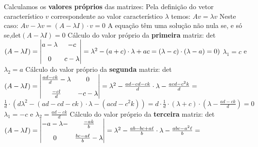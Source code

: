 \bigskip\medskip\noindent Calculamos os \textbf{valores próprios} das matrizes:\bigskip\newline\noindent
Pela definição do vetor característico $v$ correspondente ao valor característico $\lambda$ temos:\newline
$Av=\lambda v$\newline
Neste caso:\newline
$Av-\lambda v=(A- \lambda I) \cdot v=0$\newline
A equação têm uma solução não nula se, e só se,\newline det$(A- \lambda I)=0$
\newpage
\noindent Cálculo do valor próprio da \textbf{primeira} matriz:\bigskip\medskip\newline\noindent
det$(A- \lambda I)=\renewcommand{\arraystretch}{1.25}
\begin{vmatrix}
  a-\lambda & -c\medskip  \\
  0 & c- \lambda
\end{vmatrix}=\lambda^2-(a+c)\cdot \lambda +ac=(\lambda-c) \cdot (\lambda -a)=0)$\medskip\newline
$\lambda_1=c$ e $\lambda_2=a$
\bigskip\newline\noindent Cálculo do valor próprio da \textbf{segunda} matriz: \bigskip\medskip\newline\noindent
det$(A- \lambda I)=\renewcommand{\arraystretch}{1.25}
\begin{vmatrix}
  \frac{ad-ck}{d}-\lambda & 0\medskip  \\
  \frac{-cl}{d} & {-c-\lambda}
\end{vmatrix}=\lambda^2-\frac{ad-cd-ck}{d}\cdot \lambda  -\frac{acd-c^2k}{d}=$\bigskip\newline
$\frac{1}{d} \cdot (d\lambda^2 -(ad-cd-ck) \cdot \lambda - (acd-c^2k))=d \cdot \frac{1}{d} \cdot (\lambda +c ) \cdot \left(\lambda- \frac{ad-ck}{d}\right)=0$\medskip\newline
$\lambda_1=-c$ e $\lambda_2=\frac{ad-ck}{d}$
\bigskip\newline\noindent Cálculo do valor próprio da \textbf{terceira} matriz: \bigskip\medskip\newline\noindent
det$(A- \lambda I)=\renewcommand{\arraystretch}{1.25}
\begin{vmatrix}
  -a-\lambda- & \frac{-ak}{b}\medskip  \\
   0 & \frac{bc-a\ell}{b}-\lambda
\end{vmatrix}=\lambda^2-\frac{ab-bc+a\ell}{b}\cdot \lambda  -\frac{abc-a^2\ell}{b}=$\bigskip\newline
